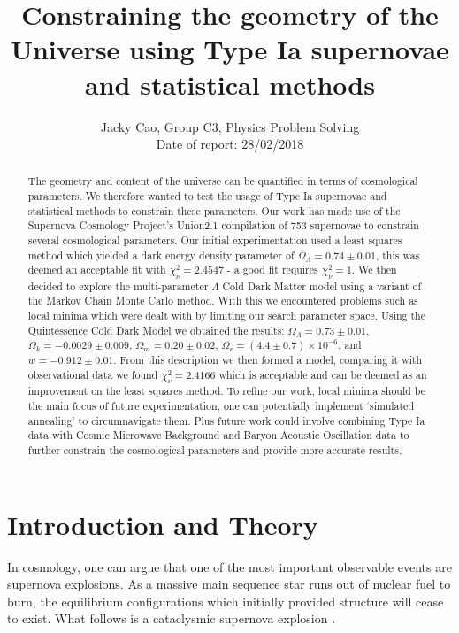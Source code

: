 \documentclass[twocolumn]{revtex4}
\begin{document}
\textheight=26.385cm

\title{Constraining the geometry of the Universe using Type Ia supernovae and statistical methods}
 
\author{Jacky Cao, Group C3, Physics Problem Solving \\ Date of report: 28/02/2018}

\begin{abstract}     
The geometry and content of the universe can be quantified in terms of cosmological parameters. We therefore wanted to test the usage of Type Ia supernovae and statistical methods to constrain these parameters. Our work has made use of the Supernova Cosmology Project's Union2.1 compilation of 753 supernovae to constrain several cosmological parameters. Our initial experimentation used a least squares method which yielded a dark energy density parameter of $\Omega_\Lambda=0.74\pm0.01$, this was deemed an acceptable fit with $\chi^2_\nu=2.4547$ - a good fit requires $\chi^2_\nu=1$. We then decided to explore the multi-parameter $\Lambda$ Cold Dark Matter model using a variant of the Markov Chain Monte Carlo method. With this we encountered problems such as local minima which were dealt with by limiting our search parameter space. Using the Quintessence Cold Dark Model we obtained the results: $\Omega_\Lambda=0.73\pm0.01$, $\Omega_k=-0.0029\pm0.009$, $\Omega_m = 0.20\pm0.02$, $\Omega_r = (4.4\pm0.7)\times10^{-6}$, and $w=-0.912\pm0.01$. From this description we then formed a model, comparing it with observational data we found $\chi^2_\nu=2.4166$ which is acceptable and can be deemed as an improvement on the least squares method. To refine our work, local minima should be the main focus of future experimentation, one can potentially implement `simulated annealing' to circumnavigate them. Plus future work could involve combining Type Ia data with Cosmic Microwave Background and Baryon Acoustic Oscillation data to further constrain the cosmological parameters and provide more accurate results.
\end{abstract}

\maketitle

\vspace{-3ex}
\section{Introduction and Theory} 
\vspace{-2ex}
In cosmology, one can argue that one of the most important observable events are supernova explosions. As a massive main sequence star runs out of nuclear fuel to burn, the equilibrium configurations which initially provided structure will cease to exist. What follows is a cataclysmic supernova explosion \cite{longair}. 
\end{document}

